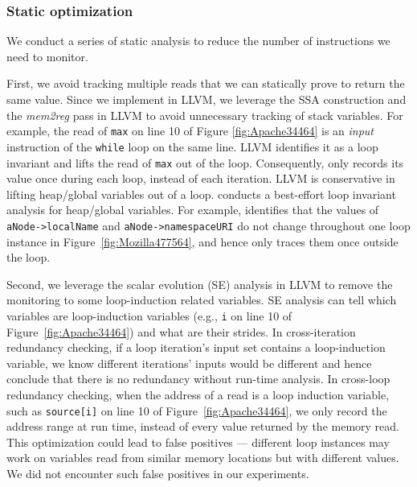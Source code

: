 \subsubsection{Static optimization}
\label{sec:perf}

We conduct a series of static analysis to reduce the number of instructions we 
need to monitor. 

First, we avoid tracking multiple reads that we can statically 
prove to return the same value.
Since we implement \Tool in LLVM, we leverage the SSA construction and the
\textit{mem2reg} pass in LLVM to avoid unnecessary tracking of
stack variables.
For example, the read of \texttt{max} on line 10 of 
Figure \ref{fig:Apache34464} is an \textit{input} instruction of the 
\texttt{while} loop on the same line. LLVM identifies it as a loop invariant
and lifts the read of \texttt{max}
out of the loop. Consequently, \Tool only records
its value once during each loop, instead of each iteration.
LLVM is conservative in lifting heap/global variables out of
a loop.
\Tool conducts a best-effort
loop invariant analysis for heap/global variables.
For example, \Tool identifies that the values of
\texttt{aNode->localName} and \texttt{aNode->namespaceURI} do not change
throughout one loop instance
in Figure~\ref{fig:Mozilla477564}, and hence only traces them once
outside the loop. 

Second, we leverage the scalar evolution (SE) analysis in LLVM to remove the 
monitoring to some loop-induction related variables.
SE analysis can tell which variables are
loop-induction variables (e.g., \texttt{i} on line 10
of Figure~\ref{fig:Apache34464}) and what are their strides. 
In cross-iteration redundancy checking,
if a loop iteration's input set contains a loop-induction
variable, we know different iterations' inputs would be different and 
hence conclude that there is no redundancy without
run-time analysis.
In cross-loop redundancy checking,
when the address of a read is a loop induction variable, such as
\texttt{source[i]} on line 10 of Figure~\ref{fig:Apache34464},
we only record the address range at run time,
instead of every value returned by the memory read.
This optimization could lead to false positives ---
different loop instances may work on variables read from
similar memory locations but with different values.
We did not encounter such false positives in our experiments.



